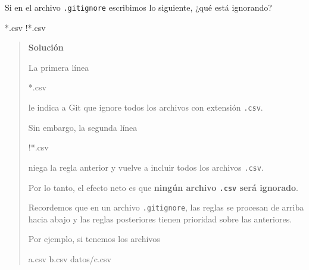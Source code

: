 \documentclass[
  spanish,
  12pt,
  letterpaper,
  DIV=11,
  numbers=noendperiod]{scrreprt}
\newenvironment{Shaded}{\begin{snugshade}}{\end{snugshade}}
\newcommand{\ExtensionTok}[1]{\textcolor[rgb]{0.00,0.23,0.31}{#1}}
\newcommand{\NormalTok}[1]{\textcolor[rgb]{0.00,0.23,0.31}{#1}}
\begin{document}
\begin{tcolorbox}[enhanced jigsaw, arc=.35mm, bottomrule=.15mm, bottomtitle=1mm, breakable, colback=white, colbacktitle=quarto-callout-note-color!10!white, colframe=quarto-callout-note-color-frame, coltitle=black, left=2mm, leftrule=.75mm, opacityback=0, opacitybacktitle=0.6, rightrule=.15mm, title=\textcolor{quarto-callout-note-color}{\faInfo}\hspace{0.5em}{Ejercicio 5}, titlerule=0mm, toprule=.15mm, toptitle=1mm]

Si en el archivo \texttt{.gitignore} escribimos lo siguiente, ¿qué está
ignorando?

\begin{Shaded}
\begin{Highlighting}[]
\ExtensionTok{*.csv}
\ExtensionTok{!*.csv}
\end{Highlighting}
\end{Shaded}

\begin{quote}
\textbf{Solución}

La primera línea

\begin{Shaded}
\begin{Highlighting}[]
\NormalTok{*.csv}
\end{Highlighting}
\end{Shaded}

le indica a Git que ignore todos los archivos con extensión
\texttt{.csv}.

Sin embargo, la segunda línea

\begin{Shaded}
\begin{Highlighting}[]
\NormalTok{!*.csv}
\end{Highlighting}
\end{Shaded}

niega la regla anterior y vuelve a incluir todos los archivos
\texttt{.csv}.

Por lo tanto, el efecto neto es que \textbf{ningún archivo \texttt{.csv}
será ignorado}.

Recordemos que en un archivo \texttt{.gitignore}, las reglas se procesan
de arriba hacia abajo y las reglas posteriores tienen prioridad sobre
las anteriores.

Por ejemplo, si tenemos los archivos

\begin{Shaded}
\begin{Highlighting}[]
\NormalTok{a.csv}
\NormalTok{b.csv}
\NormalTok{datos/c.csv}
\end{Highlighting}
\end{Shaded}


\end{quote}
\end{tcolorbox}
\end{document}
